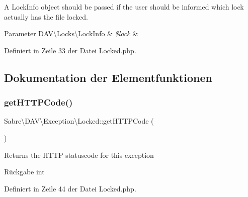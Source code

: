 A Lock\+Info object should be passed if the user should be informed which lock actually has the file locked.


\begin{DoxyParams}[1]{Parameter}
D\+A\+V\textbackslash{}\+Locks\textbackslash{}\+Lock\+Info & {\em \$lock} & \\
\hline
\end{DoxyParams}


Definiert in Zeile 33 der Datei Locked.\+php.



\subsection{Dokumentation der Elementfunktionen}
\mbox{\label{class_sabre_1_1_d_a_v_1_1_exception_1_1_locked_a8d4b466b707377f563b86b7af70c82ae}} 
\subsubsection{\texorpdfstring{get\+H\+T\+T\+P\+Code()}{getHTTPCode()}}
{\footnotesize\ttfamily Sabre\textbackslash{}\+D\+A\+V\textbackslash{}\+Exception\textbackslash{}\+Locked\+::get\+H\+T\+T\+P\+Code (\begin{DoxyParamCaption}{ }\end{DoxyParamCaption})}

Returns the H\+T\+TP statuscode for this exception

\begin{DoxyReturn}{Rückgabe}
int 
\end{DoxyReturn}


Definiert in Zeile 44 der Datei Locked.\+php.

\mbox{\label{class_sabre_1_1_d_a_v_1_1_exception_1_1_locked_af9fffe148ea513b21e69aee0b98a87b6}} 
